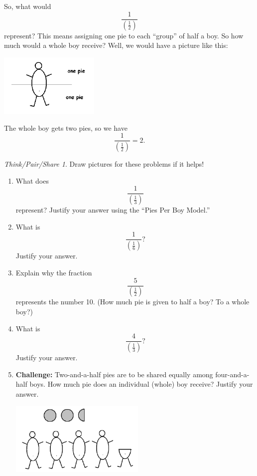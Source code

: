 \documentclass[10pt, reqno]{amsart}
\theoremstyle{remark}
\newtheorem*{thinkpair*}{Think/Pair/Share}
\theoremstyle{definition}
\numberwithin{equation}{section}  %
\begin{document}
So, what would 
\[
\frac 1 {\left( \frac 1 2\right) }
\]
 represent?
 This means assigning one pie to each ``group'' of half a boy. So how much would a
whole boy receive?  Well, we would have a picture like this:
   \begin{center}
\includegraphics[height = 3cm]{halfboy}
\end{center}
The whole boy gets two pies,
so we have
\[
\frac 1 {\left( \frac 1 2\right) }
= 2.
\]



\begin{thinkpair*}
Draw pictures for these problems if it helps!

\begin{enumerate}
\item
What does 
\[
\frac 1 {\left( \frac 1 3\right) }
\]
represent?  Justify your answer using the ``Pies Per Boy Model.''\\

\item
What is  
\[
\frac 1 {\left( \frac 1 6\right) }?
\]
Justify your answer.\\


\item
Explain why  the fraction
\[
\frac 5 {\left( \frac 1 2\right) }
\]
represents the number 10.  (How much pie is given to half a boy?  To a whole boy?)\\


\item
What is  
\[
\frac 4 {\left( \frac 1 3\right) }?
\]
Justify your answer.\\

\item{\bf Challenge:}
Two-and-a-half pies are to be shared equally among four-and-a-half boys.  How much pie does an individual (whole) boy receive?  Justify your answer.
  \begin{center}
\includegraphics[height = 3.5cm]{5ninthspie}
\end{center}




\end{enumerate}

\end{thinkpair*}
\end{document}
